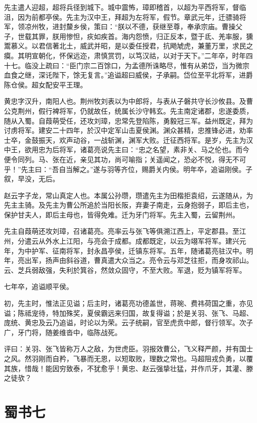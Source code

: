 \documentclass[12pt,UTF8]{ctexbook}
\begin{document}
先主遣人迎超，超将兵径到城下。城中震怖，璋即稽首，以超为平西将军，督临沮，因为前都亭侯。先主为汉中王，拜超为左将军，假节。章武元年，迁骠骑将军，领凉州牧，进封斄乡侯，策曰：“朕以不德，获继至尊，奉承宗庙。曹操父子，世载其罪，朕用惨怛，疢如疾首。海内怨愤，归正反本，暨于氐、羌率服，獯鬻慕义。以君信著北土，威武并昭，是以委任授君，抗飏虓虎，兼董万里，求民之瘼。其明宣朝化，怀保远迩，肃慎赏罚，以笃汉祜，以对于天下。”二年卒，时年四十七。临没上疏曰：“臣门宗二百馀口，为孟德所诛略尽，惟有从弟岱，当为微宗血食之继，深讬陛下，馀无复言。”追谥超曰威侯，子承嗣。岱位至平北将军，进爵陈仓侯。超女配安平王理。

黄忠字汉升，南阳人也。荆州牧刘表以为中郎将，与表从子磐共守长沙攸县。及曹公克荆州，假行裨将军，仍就故任，统属长沙守韩玄。先主南定诸郡，忠遂委质，随从入蜀。自葭萌受任，还攻刘璋，忠常先登陷陈，勇毅冠三军。益州既定，拜为讨虏将军。建安二十四年，於汉中定军山击夏侯渊。渊众甚精，忠推锋必进，劝率士卒，金鼓振天，欢声动谷，一战斩渊，渊军大败。迁征西将军。是岁，先主为汉中王，欲用忠为后将军，诸葛亮说先主曰：“忠之名望，素非关、马之伦也。而今便令同列。马、张在近，亲见其功，尚可喻指；关遥闻之，恐必不悦，得无不可乎！”先主曰：“吾自当解之。”遂与羽等齐位，赐爵关内侯。明年卒，追谥刚侯。子叙，早没，无后。

赵云字子龙，常山真定人也。本属公孙瓒，瓒遣先主为田楷拒袁绍，云遂随从，为先主主骑。及先主为曹公所追於当阳长阪，弃妻子南走，云身抱弱子，即后主也，保护甘夫人，即后主母也，皆得免难。迁为牙门将军。先主入蜀，云留荆州。

先主自葭萌还攻刘璋，召诸葛亮。亮率云与张飞等俱溯江西上，平定郡县。至江州，分遣云从外水上江阳，与亮会于成都。成都既定，以云为翊军将军。建兴元年，为中护军、征南将军，封永昌亭侯，迁镇东将军。五年，随诸葛亮驻汉中。明年，亮出军，扬声由斜谷道，曹真遣大众当之。亮令云与邓芝往拒，而身攻祁山。云、芝兵弱敌强，失利於箕谷，然敛众固守，不至大败。军退，贬为镇军将军。

七年卒，追谥顺平侯。

初，先主时，惟法正见谥；后主时，诸葛亮功德盖世，蒋琬、费祎荷国之重，亦见谥；陈祗宠待，特加殊奖，夏侯霸远来归国，故复得谥；於是关羽、张飞、马超、庞统、黄忠及云乃追谥，时论以为荣。云子统嗣，官至虎贲中郎，督行领军。次子广，牙门将，随姜维沓中，临陈战死。

评曰：关羽、张飞皆称万人之敌，为世虎臣。羽报效曹公，飞义释严颜，并有国士之风。然羽刚而自矜，飞暴而无恩，以短取败，理数之常也。马超阻戎负勇，以覆其族，惜哉！能因穷致泰，不犹愈乎！黄忠、赵云强挚壮猛，并作爪牙，其灌、滕之徒欤？

\part{蜀书七}
\end{document}
